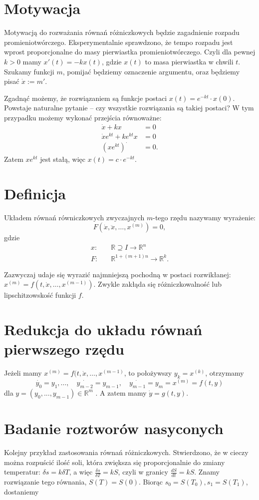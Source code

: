 \section{Motywacja}


Motywacją do rozważania równań różniczkowych będzie zagadnienie rozpadu promieniotwórczego.
Eksperymentalnie sprawdzono, że tempo rozpadu jest wprost proporcjonalne do masy pierwiastka promieniotwórczego.
Czyli dla pewnej $k>0$ mamy $x'(t)=-kx(t)$, gdzie $x\left(t \right) $ to masa pierwiastka w chwili $t$.
Szukamy funkcji $m$, pomijać będziemy oznaczenie argumentu, oraz będziemy pisać $\dot{x}:=m'$. 

Zgadnąć możemy, że rozwiązaniem są funkcje postaci $x\left( t \right) = e^{-kt}\cdot x\left( 0 \right) $. Powstaje naturalne pytanie -- czy wszystkie rozwiązania są takiej postaci? W tym przypadku możemy wykonać przejścia równoważne:
\begin{align*}
	\dot{x}+kx&=0\\
	\dot{x}e^{kt}+ke^{kt}x&=0\\
	\left( xe^{kt} \right) ^{\cdot }&=0 
.\end{align*} Zatem $xe^{kt}$ jest stałą, więc $x\left( t \right) =c\cdot e^{-kt}$. 

\section{Definicja}
Układem równań równiczkowych zwyczajnych $m$-tego rzędu nazywamy wyrażenie: \[
	F(\dot{x},\ddot{x},\ldots,x^{(m)})=0 
,\] gdzie 
\begin{align*}
	x: & \quad\mathbb{R}\supseteq I \to \mathbb{R}^{n}\\
	F:&  \quad\mathbb{R}^{1+\left( m+1 \right) n} \to \mathbb{R}^{k}
.\end{align*}

Zazwyczaj udaje się wyrazić najmniejszą pochodną w postaci rozwikłanej: $x^{\left( m \right) }=f\left( t, \dot{x}, \ldots, x^{\left( m-1 \right) } \right) $. Zwykle zakłąda się różniczkowalność lub lipschitzowskość funkcji $f$. 

\section{Redukcja do układu równań pierwszego rzędu}

Jeżeli mamy $x^{\left( m \right) }=f(t,\dot{x},\ldots,x^{\left( m-1 \right) }$, to położywszy $y_{k}=x^{(k)}$, otrzymamy $$\dot{y_{0}} = y_1, \ldots, \quad \dot{y_{m-2}}=y_{m-1}, \quad \dot{y_{m-1}}=y_m=x^{\left( m \right) }=f\left( t,y \right) $$ dla $y=\left( y_0,...,y_{m-1} \right) \in \mathbb{R}^{m}$ . 
A zatem mamy $\dot{y} = g\left( t,y \right) $.
\section{Badanie roztworów nasyconych}
Kolejny przykład zastosowania równań różniczkowych. Stwierdzono, że w cieczy można rozpuścić ilość soli, która zwiększa się proporcjonalnie do zmiany temperatur: $\delta s=k\delta T$, a więc $\frac{\delta s}{\delta T}=kS$, czyli w granicy $\frac{dS}{dt}=kS$. Znamy rozwiązanie tego równania, $S\left( T \right) =S\left( 0 \right) $. Biorąc $s_0=S(T_0), s_1=S(T_1)$, dostaniemy  
